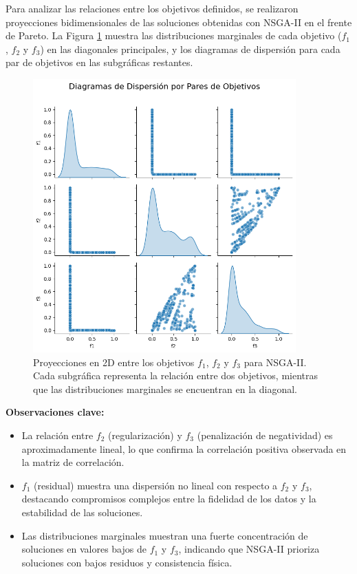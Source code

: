 Para analizar las relaciones entre los objetivos definidos, se realizaron proyecciones bidimensionales de las soluciones obtenidas con NSGA-II en el frente de Pareto. La Figura \ref{fig:objective_projections_nsga2} muestra las distribuciones marginales de cada objetivo (\(f_1\), \(f_2\) y \(f_3\)) en las diagonales principales, y los diagramas de dispersión para cada par de objetivos en las subgráficas restantes.

\begin{figure}[H]
    \centering
    \includegraphics[width=0.9\textwidth]{Images/pareto_projection_nsga2.png}
    \caption{Proyecciones en 2D entre los objetivos \( f_1 \), \( f_2 \) y \( f_3 \) para NSGA-II. Cada subgráfica representa la relación entre dos objetivos, mientras que las distribuciones marginales se encuentran en la diagonal.}
    \label{fig:objective_projections_nsga2}
\end{figure}

\textbf{Observaciones clave:}
\begin{itemize}
    \item La relación entre \(f_2\) (regularización) y \(f_3\) (penalización de negatividad) es aproximadamente lineal, lo que confirma la correlación positiva observada en la matriz de correlación.
    \item \(f_1\) (residual) muestra una dispersión no lineal con respecto a \(f_2\) y \(f_3\), destacando compromisos complejos entre la fidelidad de los datos y la estabilidad de las soluciones.
    \item Las distribuciones marginales muestran una fuerte concentración de soluciones en valores bajos de \(f_1\) y \(f_3\), indicando que NSGA-II prioriza soluciones con bajos residuos y consistencia física.
\end{itemize}

